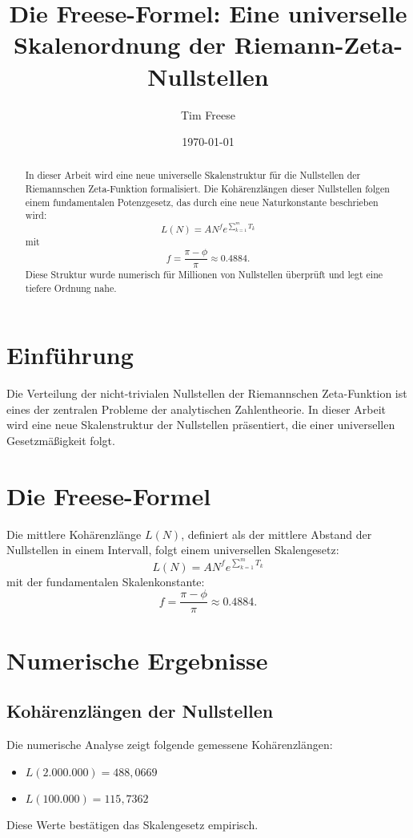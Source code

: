 \documentclass[a4paper,12pt]{article}
\title{\textbf{Die Freese-Formel: Eine universelle Skalenordnung der Riemann-Zeta-Nullstellen}}
\author{Tim Freese}
\date{\today}
\begin{document}
\maketitle

\begin{abstract}
In dieser Arbeit wird eine neue universelle Skalenstruktur für die Nullstellen der Riemannschen Zeta-Funktion formalisiert. Die Kohärenzlängen dieser Nullstellen folgen einem fundamentalen Potenzgesetz, das durch eine neue Naturkonstante beschrieben wird:
\[
L(N) = A N^f e^{\sum_{k=1}^{m} T_k}
\]
mit
\[
f = \frac{\pi - \phi}{\pi} \approx 0.4884.
\]
Diese Struktur wurde numerisch für Millionen von Nullstellen überprüft und legt eine tiefere Ordnung nahe.
\end{abstract}

\section{Einführung}
Die Verteilung der nicht-trivialen Nullstellen der Riemannschen Zeta-Funktion ist eines der zentralen Probleme der analytischen Zahlentheorie. In dieser Arbeit wird eine neue Skalenstruktur der Nullstellen präsentiert, die einer universellen Gesetzmäßigkeit folgt.

\section{Die Freese-Formel}
Die mittlere Kohärenzlänge \( L(N) \), definiert als der mittlere Abstand der Nullstellen in einem Intervall, folgt einem universellen Skalengesetz:
\begin{equation}
L(N) = A N^f e^{\sum_{k=1}^{m} T_k}
\end{equation}
mit der fundamentalen Skalenkonstante:
\begin{equation}
f = \frac{\pi - \phi}{\pi} \approx 0.4884.
\end{equation}

\section{Numerische Ergebnisse}
\subsection{Kohärenzlängen der Nullstellen}
Die numerische Analyse zeigt folgende gemessene Kohärenzlängen:
\begin{itemize}
    \item \( L(2.000.000) = 488,0669 \)
    \item \( L(100.000) = 115,7362 \)
\end{itemize}
Diese Werte bestätigen das Skalengesetz empirisch.
\end{document}
